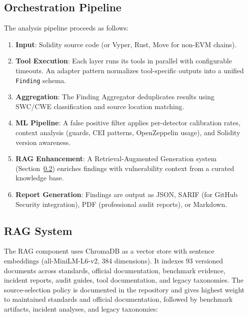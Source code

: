 \documentclass[conference]{IEEEtran}
\begin{document}
\subsection{Orchestration Pipeline}

The analysis pipeline proceeds as follows:

\begin{enumerate}
    \item \textbf{Input}: Solidity source code (or Vyper, Rust, Move for non-EVM chains).
    \item \textbf{Tool Execution}: Each layer runs its tools in parallel with configurable timeouts. An adapter pattern normalizes tool-specific outputs into a unified \texttt{Finding} schema.
    \item \textbf{Aggregation}: The Finding Aggregator deduplicates results using SWC/CWE classification and source location matching.
    \item \textbf{ML Pipeline}: A false positive filter applies per-detector calibration rates, context analysis (guards, CEI patterns, OpenZeppelin usage), and Solidity version awareness.
    \item \textbf{RAG Enhancement}: A Retrieval-Augmented Generation system (Section~\ref{sec:rag}) enriches findings with vulnerability context from a curated knowledge base.
    \item \textbf{Report Generation}: Findings are output as JSON, SARIF (for GitHub Security integration), PDF (professional audit reports), or Markdown.
\end{enumerate}

\subsection{RAG System}
\label{sec:rag}

The RAG component uses ChromaDB as a vector store with sentence embeddings (all-MiniLM-L6-v2, 384 dimensions). It indexes 93 versioned documents across standards, official documentation, benchmark evidence, incident reports, audit guides, tool documentation, and legacy taxonomies. The source-selection policy is documented in the repository and gives highest weight to maintained standards and official documentation, followed by benchmark artifacts, incident analyses, and legacy taxonomies:
\end{document}
